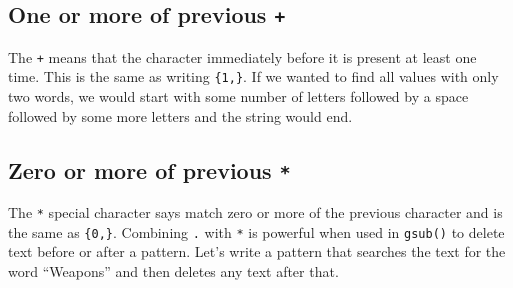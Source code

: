 \documentclass[
  12pt,
]{book}
\newenvironment{Shaded}{\begin{snugshade}}{\end{snugshade}}
\newcommand{\CommentTok}[1]{\textcolor[rgb]{0.37,0.37,0.37}{\textit{#1}}}
\newcommand{\DataTypeTok}[1]{\textcolor[rgb]{0.27,0.27,0.27}{#1}}
\newcommand{\KeywordTok}[1]{\textcolor[rgb]{0.27,0.27,0.27}{\textbf{#1}}}
\newcommand{\NormalTok}[1]{#1}
\newcommand{\OtherTok}[1]{\textcolor[rgb]{0.37,0.37,0.37}{#1}}
\newcommand{\StringTok}[1]{\textcolor[rgb]{0.5,0.5,0.5}{#1}}
\begin{document}
\hypertarget{one-or-more-of-previous}{%
\subsection{\texorpdfstring{One or more of previous \texttt{+}}{One or more of previous +}}\label{one-or-more-of-previous}}

The \texttt{+} means that the character immediately before it is present at least one time. This is the same as writing \texttt{\{1,\}}. If we wanted to find all values with only two words, we would start with some number of letters followed by a space followed by some more letters and the string would end.

\begin{Shaded}
\end{Shaded}

\hypertarget{zero-or-more-of-previous}{%
\subsection{\texorpdfstring{Zero or more of previous \texttt{*}}{Zero or more of previous *}}\label{zero-or-more-of-previous}}

The \texttt{*} special character says match zero or more of the previous character and is the same as \texttt{\{0,\}}. Combining \texttt{.} with \texttt{*} is powerful when used in \texttt{gsub()} to delete text before or after a pattern. Let's write a pattern that searches the text for the word ``Weapons'' and then deletes any text after that.
\end{document}
